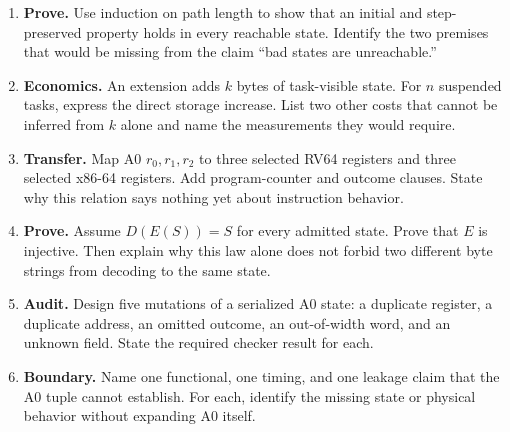 \begin{enumerate}
Rewrite state sufficiency so that it compares sets of permitted successors.
State what remains unchanged in the hidden-mode counterexample.
\item \textbf{Prove.} Use induction on path length to show that an initial and
step-preserved property holds in every reachable state. Identify the two
premises that would be missing from the claim ``bad states are unreachable.''
\item \textbf{Economics.} An extension adds \(k\) bytes of task-visible state.
For \(n\) suspended tasks, express the direct storage increase. List two other
costs that cannot be inferred from \(k\) alone and name the measurements they
would require.
\item \textbf{Transfer.} Map A0 \(r_0,r_1,r_2\) to three selected RV64
registers and three selected x86-64 registers. Add program-counter and outcome
clauses. State why this relation says nothing yet about instruction behavior.
\item \textbf{Prove.} Assume \(D(E(S))=S\) for every admitted state. Prove
that \(E\) is injective. Then explain why this law alone does not forbid two
different byte strings from decoding to the same state.
\item \textbf{Audit.} Design five mutations of a serialized A0 state: a
duplicate register, a duplicate address, an omitted outcome, an out-of-width
word, and an unknown field. State the required checker result for each.
\item \textbf{Boundary.} Name one functional, one timing, and one leakage
claim that the A0 tuple cannot establish. For each, identify the missing state
or physical behavior without expanding A0 itself.
\end{enumerate}
